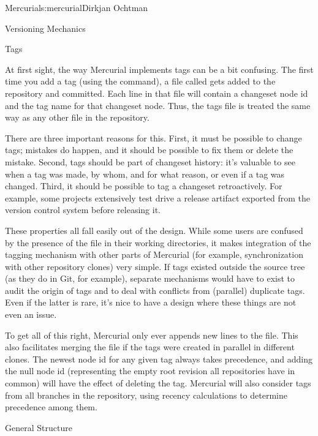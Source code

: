\begin{aosachapter}{Mercurial}{s:mercurial}{Dirkjan Ochtman}
\begin{aosasect1}{Versioning Mechanics}
\begin{aosasect2}{Tags}

At first sight, the way Mercurial implements tags can be a bit
confusing. The first time you add a tag (using the 
command), a file called  gets added to the repository and
committed. Each line in that file will contain a changeset node id and
the tag name for that changeset node. Thus, the tags file is treated
the same way as any other file in the repository.

There are three important reasons for this. First, it must be possible
to change tags; mistakes do happen, and it should be possible to fix
them or delete the mistake. Second, tags should be part of changeset
history: it's valuable to see when a tag was made, by whom, and for
what reason, or even if a tag was changed. Third, it should be
possible to tag a changeset retroactively. For example, some projects
extensively test drive a release artifact exported from the version
control system before releasing it.

These properties all fall easily out of the  design. While some
users are confused by the presence of the  file in their
working directories, it makes integration of the tagging mechanism
with other parts of Mercurial (for example, synchronization with other
repository clones) very simple. If tags existed outside the source
tree (as they do in Git, for example), separate mechanisms would have
to exist to audit the origin of tags and to deal with conflicts from
(parallel) duplicate tags. Even if the latter is rare, it's nice to
have a design where these things are not even an issue.

To get all of this right, Mercurial only ever appends new lines to the
 file. This also facilitates merging the file if the
tags were created in parallel in different clones. The newest node id
for any given tag always takes precedence, and adding the null node id
(representing the empty root revision all repositories have in common)
will have the effect of deleting the tag. Mercurial will also consider
tags from all branches in the repository, using recency calculations
to determine precedence among them.

\end{aosasect2}

\end{aosasect1}

\begin{aosasect1}{General Structure}


\end{aosasect1}
\end{aosachapter}
